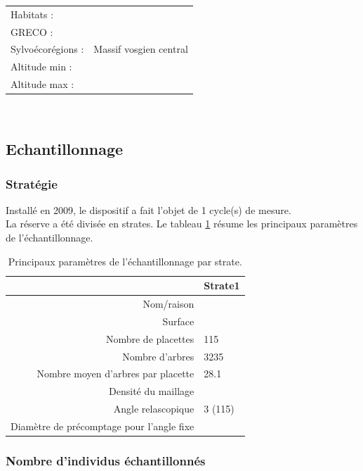 \documentclass[a4paper]{book}\usepackage[]{graphicx}\usepackage[]{color}
\begin{document}
\begin{tabular}{ll}
Habitats : & \\
GRECO : & \\
Sylvoécorégions : & Massif vosgien central\\
Altitude min : &  \\
Altitude max : &  \\
\end{tabular} \\



\subsection{Echantillonnage}
\subsubsection{Stratégie}
Installé en 2009, le dispositif a fait l’objet de 1 cycle(s) de mesure.\\

La réserve a été divisée en strates. Le tableau \ref{Echantillonnage} résume les principaux paramètres de l'échantillonnage. \\
\begin{table}[ht]
\centering
{\footnotesize
\begin{tabular}{rl}
  \hline
 & Strate1 \\ 
  \hline
Nom/raison &  \\ 
  Surface &  \\ 
  Nombre de placettes & 115 \\ 
  Nombre d’arbres & 3235 \\ 
  Nombre moyen d’arbres par placette & 28.1 \\ 
  Densité du maillage &  \\ 
  Angle relascopique & 3 (115) \\ 
  Diamètre de précomptage pour l'angle fixe &  \\ 
   \hline
\end{tabular}
}
\caption{Principaux paramètres de l'échantillonnage par strate.} 
\label{Echantillonnage}
\end{table}


\subsubsection{Nombre d'individus échantillonnés}
\end{document}
